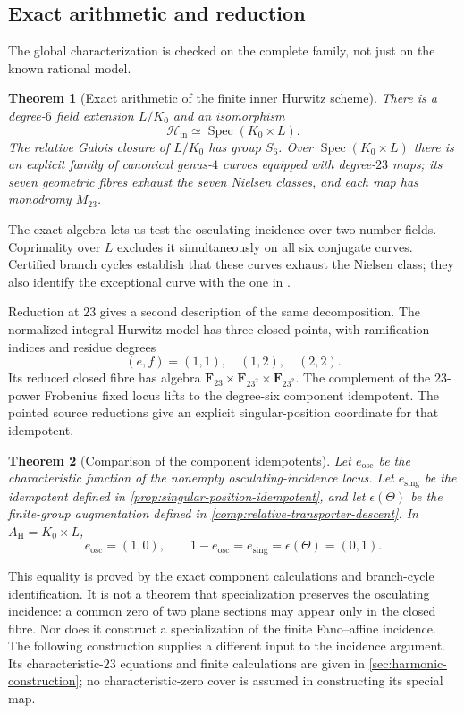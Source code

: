 \documentclass[11pt]{amsart}
\newtheorem{theorem}{Theorem}[section]
\theoremstyle{definition}
\theoremstyle{remark}
\newcommand{\FF}{\mathbf F}
\begin{document}
\subsection{Exact arithmetic and reduction}

The global characterization is checked on the complete family, not just
on the known rational model.

\begin{theorem}[Exact arithmetic of the finite inner Hurwitz scheme]
\label{thm:hurwitz-summary}
There is a degree-$6$ field extension $L/K_0$ and an isomorphism
\[
 \mathcal H_{\mathrm{in}}\simeq\operatorname{Spec}(K_0\times L).
\]
The relative Galois closure of $L/K_0$ has group $S_6$.  Over
$\operatorname{Spec}(K_0\times L)$ there is an explicit family of canonical
genus-$4$ curves equipped with degree-$23$ maps; its seven geometric fibres
exhaust the seven Nielsen classes, and each map has monodromy $M_{23}$.
\end{theorem}

The exact algebra lets us test the osculating incidence over two number
fields.  Coprimality over $L$ excludes it simultaneously on all six
conjugate curves.  Certified branch cycles establish that these curves
exhaust the Nielsen class; they also identify the exceptional curve
with the one in \cite{HJLPPZ}.

Reduction at $23$ gives a second description of the same decomposition.
The normalized integral Hurwitz model has three closed points, with
ramification indices and residue degrees
\[
 (e,f)=(1,1),\quad(1,2),\quad(2,2).
\]
Its reduced closed fibre has algebra
$\FF_{23}\times\FF_{23^2}\times\FF_{23^2}$.
The complement of the $23$-power Frobenius fixed locus lifts to the
degree-six component idempotent.  The pointed source reductions give
an explicit singular-position coordinate for that idempotent.

\begin{theorem}[Comparison of the component idempotents]
\label{thm:connector}
Let $e_{\mathrm{osc}}$ be the characteristic function of the nonempty
osculating-incidence locus.  Let $e_{\mathrm{sing}}$ be the idempotent
defined in \cref{prop:singular-position-idempotent}, and let
$\epsilon(\Theta)$ be the finite-group augmentation defined in
\cref{comp:relative-transporter-descent}.  In $A_{\mathrm H}=K_0\times L$,
\[
 e_{\mathrm{osc}}=(1,0),\qquad
 1-e_{\mathrm{osc}}=e_{\mathrm{sing}}=\epsilon(\Theta)=(0,1).
\]
\end{theorem}

This equality is proved by the exact component calculations and
branch-cycle identification.  It is not a theorem that specialization
preserves the osculating incidence: a common zero of two plane sections
may appear only in the closed fibre.  Nor does it construct a
specialization of the finite Fano--affine incidence.
The following construction supplies a different input to the incidence
argument.  Its characteristic-$23$ equations and finite calculations
are given in \cref{sec:harmonic-construction}; no characteristic-zero
cover is assumed in constructing its special map.
\end{document}
